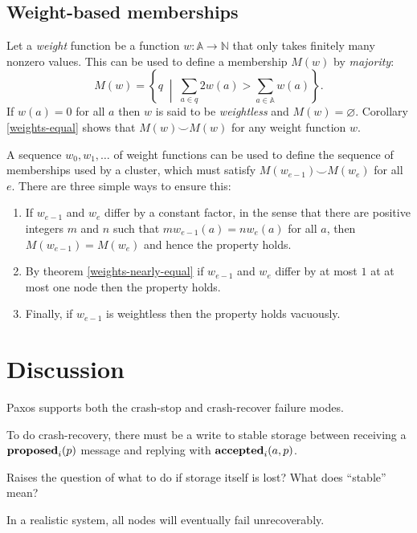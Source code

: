 \documentclass[journal]{IEEEtran}
\begin{document}
\subsection{Weight-based memberships}
\label{weight-based-memberships}

Let a \textit{weight} function be a function $w : \mathbb A \to \mathbb N$ that
only takes finitely many nonzero values. This can be used to define a
membership $M(w)$ by \textit{majority}: \[M(w) = \left\{ q \;\middle|\; \sum_{a
\in q} 2 w(a) > \sum_{a \in \mathbb A} w(a) \right\}.\] If $w(a) = 0$ for all
$a$ then $w$ is said to be \textit{weightless} and $M(w) = \varnothing$.
Corollary \ref{weights-equal} shows that $M(w) \smile M(w)$ for any weight
function $w$.

A sequence $w_0, w_1, \ldots$ of weight functions can be used to define the
sequence of memberships used by a cluster, which must satisfy $M(w_{e-1})
\smile M(w_e)$ for all $e$.  There are three simple ways to ensure this:

\begin{enumerate}

\item If $w_{e-1}$ and $w_e$ differ by a constant factor, in the sense that
there are positive integers $m$ and $n$ such that $m w_{e-1}(a) = n w_e(a)$
for all $a$, then $M(w_{e-1}) = M(w_e)$ and hence the property holds.

\item By theorem \ref{weights-nearly-equal} if $w_{e-1}$ and $w_e$
differ by at most $1$ at at most one node then the property holds.

\item Finally, if $w_{e-1}$ is weightless then the property holds vacuously.

\end{enumerate}

\section{Discussion}

Paxos supports both the crash-stop and crash-recover failure modes.

To do crash-recovery, there must be a write to stable storage between
receiving a $\mathbf{proposed}_{i}(p)$ message and replying with $\mathbf{accepted}_{i}(a,p)$.

Raises the question of what to do if storage itself is lost? What does
``stable'' mean?

In a realistic system, all nodes will eventually fail unrecoverably.
\end{document}
